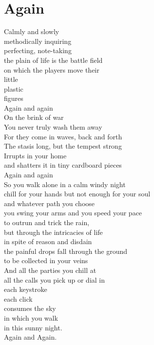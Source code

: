 \documentclass[a4paper,twoside, openany]{book}
\newenvironment{Verse}
  {\center\varwidth{\linewidth}\fontsize{18}{21.6}\selectfont}
  {\endvarwidth\endcenter}
\begin{document}
\chapter{Again}
\begin{Verse}
Calmly and slowly\\
methodically inquiring\\
perfecting, note-taking\\
the plain of life is the battle field\\
on which the players move their \\little \\plastic \\ figures\\
Again and again\\
On the brink of war\\
You never truly wash them away\\
For they come in waves, back and forth\\
The stasis long, but the tempest strong\\
Irrupts in your home\\
and shatters it in tiny cardboard pieces\\
Again and again\\
So you walk alone in a calm windy night\\
chill for your hands but not enough for your soul\\
\end{Verse}
\clearpage
\begin{Verse}
and whatever path you choose\\
you swing your arms and you speed your pace\\
to outrun and trick the rain,\\
but through the intricacies of life\\
in spite of reason and disdain\\
the painful drops fall through the ground\\
to be collected in your veins\\
And all the parties you chill at\\
all the calls you pick up or dial in\\
each keystroke\\
each click\\
consumes the sky\\
in which you walk\\
in this sunny night.\\
Again and Again.
\end{Verse}
\end{document}
